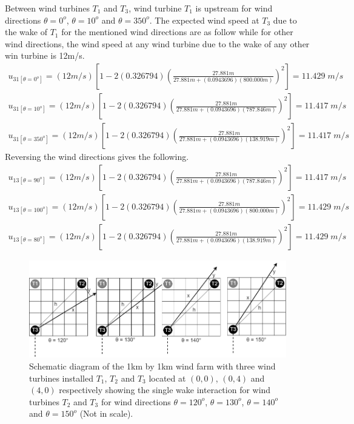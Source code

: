 	Between wind turbines $T_1$ and $T_3$, wind turbine $T_1$ is upstream for wind directions $\theta=0^o$, $\theta=10^o$ and $\theta=350^o$. The expected wind speed at $T_3$ due to the wake of $T_1$ for the mentioned wind directions are as follow while for other wind directions, the wind speed at any wind turbine due to the wake of any other win turbine is 12m/s.
	\begin{align*}
	    u_{31[\theta=0^o]} = (12m/s) \left[ 1-2(0.326794)\left( \frac{27.881m}{27.881m+(0.0943696) (800.000m)} \right)^2 \right] = 11.429\;m/s \\
	    u_{31[\theta=10^o]} = (12m/s) \left[ 1-2(0.326794)\left( \frac{27.881m}{27.881m+(0.0943696) (787.846m)} \right)^2 \right] = 11.417\;m/s \\
	    u_{31[\theta=350^o]} = (12m/s) \left[ 1-2(0.326794)\left( \frac{27.881m}{27.881m+(0.0943696) (138.919m)} \right)^2 \right] = 11.417\;m/s
	\end{align*}
	Reversing the wind directions gives the following.
	\begin{align*}
	    u_{13[\theta=90^o]} = (12m/s) \left[ 1-2(0.326794)\left( \frac{27.881m}{27.881m+(0.0943696) (787.846m)} \right)^2 \right] = 11.417\;m/s \\
	    u_{13[\theta=100^o]} = (12m/s) \left[ 1-2(0.326794)\left( \frac{27.881m}{27.881m+(0.0943696) (800.000m)} \right)^2 \right] = 11.429\;m/s \\
	    u_{13[\theta=80^o]} = (12m/s) \left[ 1-2(0.326794)\left( \frac{27.881m}{27.881m+(0.0943696) (138.919m)} \right)^2 \right] = 11.429\;m/s
	\end{align*}
	
	\begin{figure}[H]
	    \centering
	    \includegraphics[width=\linewidth]{Figures/schematicsBest3c.png}
	    \caption{Schematic diagram of the 1km by 1km wind farm with three wind turbines installed $T_1$, $T_2$ and $T_3$ located at $(0,0)$, $(0,4)$ and $(4,0)$ respectively showing the single wake interaction for wind turbines $T_2$ and $T_3$ for wind directions $\theta=120^o$, $\theta=130^o$, $\theta=140^o$ and $\theta=150^o$ (Not in scale).}
	    \label{schematicsBest3c}
	\end{figure}
	
